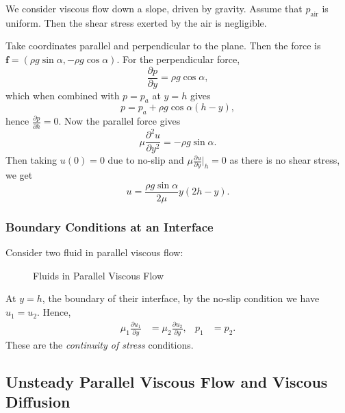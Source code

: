\documentclass[12pt]{article}
\begin{document}
\begin{exbox}
	We consider viscous flow down a slope, driven by gravity. Assume that $p_{\mathrm{air}}$ is uniform. Then the shear stress exerted by the air is negligible.

	Take coordinates parallel and perpendicular to the plane. Then the force is $\mathbf{f} = (\rho g \sin \alpha, - \rho g \cos \alpha)$. For the perpendicular force,
	\[
	\frac{\partial p}{\partial y} = \rho g \cos \alpha,
	\]
	which when combined with $p = p_{a}$ at $y = h$ gives
	\[
	p = p_a + \rho g \cos \alpha (h - y)
	,\]
	hence $\frac{\partial p}{\partial h} = 0$. Now the parallel force gives
	\[
	\mu \frac{\partial^2 u}{\partial y^2} = - \rho g \sin \alpha
	.\]
	Then taking $u(0) = 0$ due to no-slip and $\mu \frac{\partial u}{\partial y} |_h = 0$ as there is no shear stress, we get
	\[
	u = \frac{\rho g \sin \alpha}{2 \mu} y(2h - y)
	.\]
\end{exbox}


\subsubsection{Boundary Conditions at an Interface}
\label{subsub:boundary_conditions_at_an_interface}

Consider two fluid in parallel viscous flow:
\begin{figure}[h]
	\centering
	\caption{Fluids in Parallel Viscous Flow}
	\label{fig:parallel_viscous_fluids}
\end{figure}
At $y = h$, the boundary of their interface, by the no-slip condition we have $u_1 = u_2$. Hence,
\begin{align*}
	\mu_1 \frac{\partial u_1}{\partial y} &= \mu_2 \frac{\partial u_2}{\partial y}, & p_1 &= p_2
.\end{align*}
These are the \emph{continuity of stress} conditions.

\subsection{Unsteady Parallel Viscous Flow and Viscous Diffusion}
\label{sub:unsteady_parallel_viscous_flow_and_viscous_diffusion}
\end{document}
